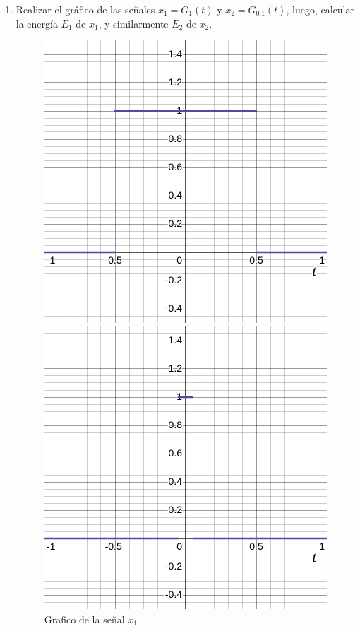 \documentclass[12pt,a4paper]{report}
\begin{document}
\begin{enumerate}[label=\alph*),left=0pt]

  \item Realizar el gráfico de las señales $x_1 = G_1(t)$ y $x_2 = G_{0.1}(t)$, luego, calcular la energía $E_1$ de 
    $x_1$, y similarmente $E_2$ de $x_2$.

    \begin{figure}[h!]
      \hspace{6mm}
      \begin{minipage}{0.45\textwidth}
        \centering
        \includegraphics[width=\textwidth]{images/ej3.1}
        \caption{Grafico de la señal $x_1$}
        \label{fig:imagen1}
      \end{minipage}
      \hfill
      \begin{minipage}{0.45\textwidth}
        \includegraphics[width=\textwidth]{images/ej3.2}

\end{minipage}
\end{figure}
\end{enumerate}
\end{document}
